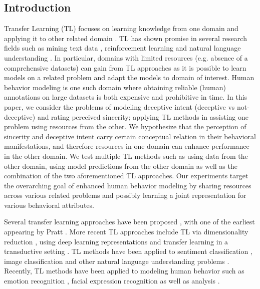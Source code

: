 \documentclass{article}
\begin{document}
\begin{spacing}{0.89}
\section{Introduction}
\vspace{-3mm}
\label{sec:intro}
Transfer Learning (TL) focuses on learning knowledge from one domain and applying it to other related domain \cite{pan2010survey}. 
TL has shown promise in several research fields such as mining text data \cite{aggarwal2012mining}, reinforcement learning \cite{taylor2009transfer} and natural language understanding \cite{blitzer2007biographies}.  
In particular, domains with limited resources (e.g. absence of a comprehensive datasets) can gain from TL approaches as it is possible to learn models on a related problem and adapt the models to domain of interest. 
Human behavior modeling \cite{luo2008agent,narayanan2013behavioral} is one such domain where obtaining reliable (human) annotations on large datasets is both expensive and prohibitive in time.
In this paper, we consider the problems of modeling deceptive intent (deceptive vs not-deceptive) and rating perceived sincerity; applying TL methods in assisting one problem using resources from the other. 
We hypothesize that the perception of sincerity and deceptive intent carry certain conceptual relation in their behavioral manifestations, and therefore resources in one domain can enhance performance in the other domain.
We test multiple TL methods such as using data from the other domain, using model predictions from the other domain as well as the combination of the two aforementioned TL approaches. 
Our experiments target the overarching goal of enhanced human behavior modeling by sharing resources across various related problems and possibly learning a joint representation for various behavioral attributes. 

Several transfer learning approaches have been proposed \cite{pan2010survey}, with one of the earliest appearing by Pratt \cite{pratt1993discriminability}. 
More recent TL approaches include TL via dimensionality reduction \cite{pan2008transfer}, using deep learning representations \cite{bengio2012deep, mesnil2012unsupervised} and transfer learning in a transductive setting \cite{rohrbach2013transfer}.  
TL methods have been applied to sentiment classification \cite{blitzer2007biographies}, image classification \cite{wu2004improving} and other natural language understanding problems \cite{arnold2007comparative,blitzer2006domain}. 
Recently, TL methods have been applied to modeling human behavior such as emotion recognition \cite{zhang2016enhanced}, facial expression recognition \cite{chen2013learning} as well as analysis \cite{sangineto2014we}.


\end{spacing}
\end{document}
